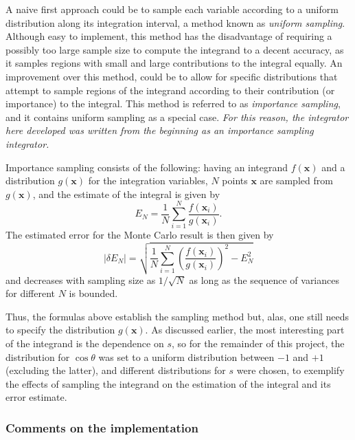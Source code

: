 A naive first approach could be to sample each variable according to a uniform distribution along its integration interval, a method known as \textit{uniform sampling}. Although easy to implement, this method has the disadvantage of requiring a possibly too large sample size to compute the integrand to a decent accuracy, as it samples regions with small and large contributions to the integral equally. An improvement over this method, could be to allow for specific distributions that attempt to sample regions of the integrand according to their contribution (or importance) to the integral. This method is referred to as \textit{importance sampling}, and it contains uniform sampling as a special case. \emph{For this reason, the integrator here developed was written from the beginning as an importance sampling integrator.}

Importance sampling consists of the following: having an integrand $f(\mathbf{x})$ and a distribution $g(\mathbf{x})$ for the integration variables, $N$ points $\mathbf{x}$ are sampled from $g(\mathbf{x})$, and the estimate of the integral is given by
\begin{equation}
    E_{N} = \frac{1}{N} \sum_{i = 1}^{N} \frac{f(\mathbf{x}_{i})}{g(\mathbf{x}_{i})}.
\end{equation}
The estimated error for the Monte Carlo result is then given by
\begin{equation}
    \lvert \delta E_{N} \rvert = \sqrt{\frac{1}{N} \sum_{i = 1}^{N} \left( \frac{f(\mathbf{x}_{i})}{g(\mathbf{x}_{i})}\right)^{2} - E_{N}^{2}}
\end{equation}
and decreases with sampling size as $1/\sqrt{N}$ as long as the sequence of variances for different $N$ is bounded.

\newpage

Thus, the formulas above establish the sampling method but, alas, one still needs to specify the distribution $g(\mathbf{x})$. As discussed earlier, the most interesting part of the integrand is the dependence on $s$, so for the remainder of this project, the distribution for $\cos{\theta}$ was set to a uniform distribution between $-1$ and $+1$ (excluding the latter), and different distributions for $s$ were chosen, to exemplify the effects of sampling the integrand on the estimation of the integral and its error estimate.

\subsubsection*{Comments on the implementation}

